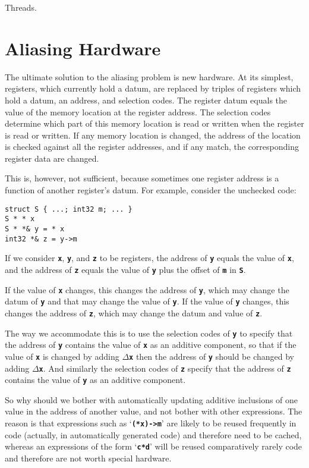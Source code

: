 \documentclass[12pt]{article}
\newcommand{\TT}[1]{{\tt \bfseries #1}}
\newenvironment{indpar}[1][0.3in]%
	{\begin{list}{}%
		     {\setlength{\itemsep}{0in}%
		      \setlength{\topsep}{0in}%
		      \setlength{\parsep}{1ex}%
		      \setlength{\labelwidth}{#1}%
		      \setlength{\leftmargin}{#1}%
		      \addtolength{\leftmargin}{\labelsep}}%
	 \item}%
	{\end{list}}
\begin{document}
Threads.
\label{THREADS}

\appendix

\section{Aliasing Hardware}
\label{ALIASING-HARDWARE}

The ultimate solution to the aliasing problem is new hardware.
At its simplest, registers, which currently hold a datum,
are replaced by triples of registers which hold a datum,
an address, and selection codes.  The register datum equals the value
of the memory location at the register address.  The selection
codes determine which part of this memory location is read or written
when the register is read or written.  If any memory location is
changed, the address of the location is checked against all the
register addresses, and if any match, the corresponding register
data are changed.

This is, however, not sufficient, because sometimes one register
address is a function of another register's datum.  For example,
consider the unchecked code:
\begin{indpar}[0.5em]\begin{verbatim}
struct S { ...; int32 m; ... }
S * * x
S * *& y = * x
int32 *& z = y->m
\end{verbatim}\end{indpar}
If we consider \TT{x}, \TT{y}, and \TT{z} to be registers,
the address of \TT{y} equals the value of \TT{x}, and the
address of \TT{z} equals the value of \TT{y} plus the offset of
\TT{m} in \TT{S}.

If the value of \TT{x} changes, this changes the address of \TT{y},
which may change the datum of \TT{y} and that may change the value
of \TT{y}.  If the value of \TT{y} changes, this changes the address
of \TT{z}, which may change the datum and value of \TT{z}.

The way we accommodate this is to use the selection codes of \TT{y}
to specify that the address of \TT{y} contains the value of \TT{x}
as an additive component, so
that if the value of \TT{x} is changed by adding $\Delta$\TT{x}
then the address of \TT{y} should be changed by adding $\Delta$\TT{x}.
And similarly the selection codes
of \TT{z} specify that the address of \TT{z}
contains the value of \TT{y} as an additive component.

So why should we bother with automatically updating
additive inclusions of one value in the
address of another value, and not bother with other expressions.
The reason is that expressions such as
`\TT{(*x)->m}' are likely to be reused frequently in code (actually,
in automatically generated code) and
therefore need to be cached, whereas an expressions of the form
`\TT{c*d}' will be reused comparatively rarely code
and therefore are not worth special hardware.





\printindex
\end{document}
